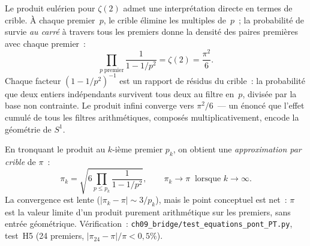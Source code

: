 \documentclass[12pt,a4paper]{article}
\begin{document}
\begin{remarque}
\label{rem:pi_computation}
Le produit eulérien pour $\zeta(2)$ admet une interprétation directe
en termes de crible. À chaque premier~$p$, le crible élimine les
multiples de~$p$~; la probabilité de survie \emph{au carré} à travers
tous les premiers donne la densité des paires premières avec chaque
premier~:
\begin{equation}
  \prod_{p\;\text{premier}} \frac{1}{1 - 1/p^2} = \zeta(2) = \frac{\pi^2}{6}.
  \label{eq:euler_pi}
\end{equation}
Chaque facteur $(1 - 1/p^2)^{-1}$ est un rapport de résidus du
crible~: la probabilité que deux entiers indépendants survivent
tous deux au filtre en~$p$, divisée par la base non contrainte. Le
produit infini converge vers $\pi^2/6$~--- un énoncé que l'effet
cumulé de tous les filtres arithmétiques, composés
multiplicativement, encode la géométrie de $S^1$.

En tronquant le produit au $k$-ième premier $p_k$, on obtient une
\emph{approximation par crible} de $\pi$~:
\begin{equation}
  \pi_k = \sqrt{6 \prod_{p \leq p_k} \frac{1}{1 - 1/p^2}},
  \qquad \pi_k \to \pi \;\;\text{lorsque } k \to \infty.
  \label{eq:pi_sieve}
\end{equation}
La convergence est lente ($|\pi_k - \pi| \sim 3/p_k$), mais le
point conceptuel est net~: $\pi$ est la valeur limite d'un produit
purement arithmétique sur les premiers, sans entrée géométrique.
Vérification~: \texttt{ch09\_bridge/test\_equations\_pont\_PT.py},
test~H5 (24 premiers, $|\pi_{24} - \pi|/\pi < 0{,}5\%$).
\end{remarque}
\end{document}
